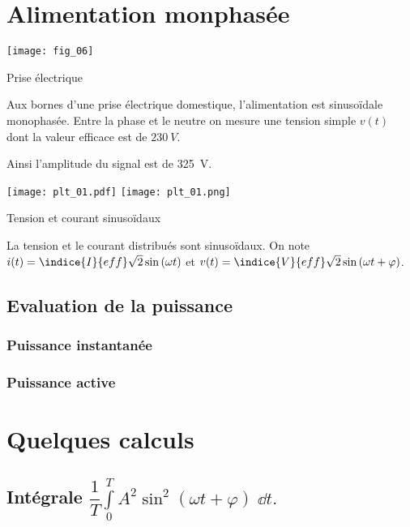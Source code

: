 \section{Alimentation monphasée}

\begin{marginfigure}
\centering
\texttt{[image: fig\_06]}
\caption{Prise électrique \label{fig:ge:cours:06}}
\end{marginfigure}

Aux bornes d'une prise électrique domestique, l'alimentation est sinusoïdale monophasée. Entre la phase et le neutre on mesure une tension simple $v(t)$ dont la valeur efficace est de $\SI{230}{V}$.

Ainsi l'amplitude du signal est de \SI{325}{V}.

\begin{marginfigure}
\centering
\texttt{[image: plt\_01.pdf]}
\texttt{[image: plt\_01.png]}
\caption{ Tension et courant sinusoïdaux\label{fig:ge:cours:plt:01}}

\end{marginfigure}

La tension et le courant distribués sont sinusoïdaux. On note 
$i(t)=\indice{I}{eff}\sqrt{2}\sin\left(\omega t\right)$ et 
$v(t)=\indice{V}{eff}\sqrt{2}\sin\left(\omega t + \varphi \right)$.

\subsection{Evaluation de la puissance}
\subsubsection{Puissance instantanée}
\subsubsection{Puissance active}


\section{Quelques calculs}

\subsection{Intégrale $\dfrac{1}{T} \int\limits_{0}^{T} A^2 \sin^2(\omega t + \varphi)\; \dd t.$ \label{calcul:01}}

